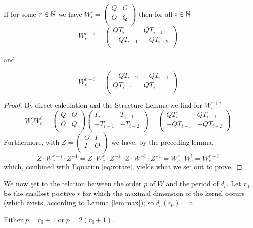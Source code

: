 \begin{lemma}\label{mirror}
  If for some $r\in\mathbb{N}$ we have $W_{c}^{r} = \left(\begin{smallmatrix} Q & O \\ O & Q \\\end{smallmatrix}\right)$ then for all $i\in\mathbb{N}$
  \[
  W_{c}^{r+i} = \left(\begin{array}{cc} QT_{i} & QT_{i-1} \\ -QT_{i-1} & -QT_{i-2} \\\end{array}\right)
  \]

  and

  \[
  W_{c}^{r-i} = \left(\begin{array}{cc} -QT_{i-2} & -QT_{i-1} \\ QT_{i-1} & QT_{i} \\\end{array}\right)
  \]
\end{lemma}

\begin{proof}
  By direct calculation and the Structure Lemma we find for $W_{c}^{r+i}$
  \[
  W_{c}^{r}W_{c}^{i}
  =
  \left(
  \begin{array}{cc}
    Q & O \\
    O & Q \\
  \end{array}
  \right)
  \left(
  \begin{array}{cc}
     T_{i} &  T_{i-1}  \\
    -T_{i-1} & -T_{i-2} \\
  \end{array}
  \right)
  =
  \left(
  \begin{array}{cc}
     QT_{i} &  QT_{i-1}  \\
    -QT_{i-1} & -QT_{i-2} \\
  \end{array}
  \right)
  \]
  Furthermore, with $Z=\left(\begin{smallmatrix} O & I \\ I & O \\\end{smallmatrix}\right)$
  we have, by the preceding lemma,
  \[Z\cdot W_{c}^{r-i}\cdot Z^{-1}=Z\cdot W_{c}^{r}\cdot Z^{-1}\cdot Z\cdot W^{-i}\cdot Z^{-1}=W_{c}^{r}\cdot W_{c}^{i}=W_{c}^{r+i}\]
  which, combined with Equation \ref{eq:rotate}, yields what we set out to prove.
\end{proof}
We now get to the relation between the order $p$ of $W$ and the period of
$d_c$. Let $r_0$ be the smallest positive $r$ for which the maximal
dimension of the kernel occurs (which exists, according to Lemma
\ref{lem:max}); so $d_c(r_0)=c$.
\begin{lemma}\label{lem:half}
  Either $p=r_0+1$ or $p=2(r_0+1)$.
\end{lemma}

